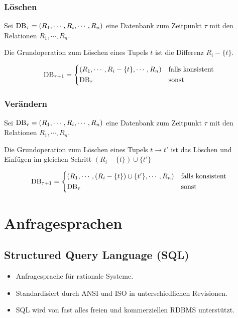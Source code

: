         \subsection{Löschen} %
            Sei \( \operatorname{DB}_\tau = (R_1, \cdots, R_i, \cdots, R_n) \) eine Datenbank zum Zeitpunkt \(\tau\) mit den Relationen \( R_1, \cdots, R_n \).
            
            Die Grundoperation zum Löschen eines Tupels \( t \) ist die Differenz \( R_i - \{t\} \).
            
            \begin{equation*}
	            \DB_{\tau + 1} =
		            \begin{cases*}
			            (R_1, \cdots, R_i - \{t\}, \cdots, R_n) & \text{falls konsistent} \\
			            \DB_\tau                                & \text{sonst}
		            \end{cases*}
            \end{equation*}

        \subsection{Verändern} %
            Sei \( \operatorname{DB}_\tau = (R_1, \cdots, R_i, \cdots, R_n) \) eine Datenbank zum Zeitpunkt \(\tau\) mit den Relationen \( R_1, \cdots, R_n \).
            
            Die Grundoperation zum Löschen eines Tupels \( t \rightarrow t' \) ist das Löschen und Einfügen im gleichen Schritt \( (R_i - \{t\}) \cup \{t'\} \)
            
            \begin{equation*}
	            \DB_{\tau + 1} =
		            \begin{cases*}
			            (R_1, \cdots, (R_i - \{t\}) \cup \{t'\}, \cdots, R_n) & \text{falls konsistent} \\
			            \DB_\tau                                              & \text{sonst}
		            \end{cases*}
            \end{equation*}

\chapter{Anfragesprachen} %
    \label{c:sql}

    \section{Structured Query Language (SQL)} %
    	\begin{itemize}
    		\item Anfragesprache für rationale Systeme.
    		\item Standardisiert durch ANSI und ISO in unterschiedlichen Revisionen.
    		\item SQL wird von fast alles freien und kommerziellen RDBMS unterstützt.
    	\end{itemize}

